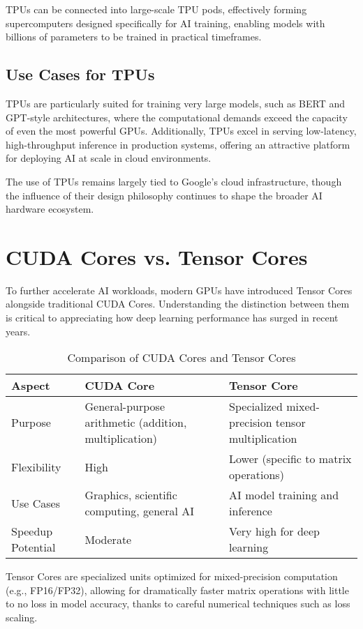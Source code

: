 \documentclass[openany]{book}
\begin{document}
TPUs can be connected into large-scale TPU pods, effectively forming 
supercomputers designed specifically for AI training, enabling models with 
billions of parameters to be trained in practical timeframes.

\subsection{Use Cases for TPUs}
TPUs are particularly suited for training very large models, such as BERT and 
GPT-style architectures, where the computational demands exceed the capacity of 
even the most powerful GPUs. Additionally, TPUs excel in serving low-latency, 
high-throughput inference in production systems, offering an attractive platform 
for deploying AI at scale in cloud environments.

The use of TPUs remains largely tied to Google's cloud infrastructure, though 
the influence of their design philosophy continues to shape the broader AI 
hardware ecosystem.

\section{CUDA Cores vs. Tensor Cores}

To further accelerate AI workloads, modern GPUs have introduced Tensor Cores 
alongside traditional CUDA Cores. Understanding the distinction between them is 
critical to appreciating how deep learning performance has surged in recent 
years.

\begin{table}[h]
\centering
\begin{tabular}{|l|l|l|}
\hline
\textbf{Aspect} & \textbf{CUDA Core} & \textbf{Tensor Core} \\ \hline
Purpose & General-purpose arithmetic (addition, multiplication) & Specialized 
mixed-precision tensor multiplication \\ \hline
Flexibility & High & Lower (specific to matrix operations) \\ \hline
Use Cases & Graphics, scientific computing, general AI & AI model training and 
inference \\ \hline
Speedup Potential & Moderate & Very high for deep learning \\ \hline
\end{tabular}
\caption{Comparison of CUDA Cores and Tensor Cores}
\end{table}

Tensor Cores are specialized units optimized for mixed-precision computation 
(e.g., FP16/FP32), allowing for dramatically faster matrix operations with 
little to no loss in model accuracy, thanks to careful numerical techniques such 
as loss scaling.
\end{document}
